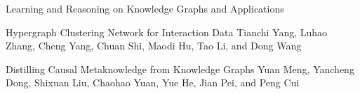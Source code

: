 \documentclass[11pt]{article}
\begin{document}
\begin{bulletin}
\begin{articlesection}{Learning and Reasoning on Knowledge Graphs and Applications}
\begin{article}
{Hypergraph Clustering Network for Interaction Data}
{Tianchi Yang, Luhao Zhang, Cheng Yang, Chuan Shi, Maodi Hu, Tao Li, and Dong Wang}

\end{article}


\begin{article}
{Distilling Causal Metaknowledge from Knowledge Graphs}
{Yuan Meng, Yancheng Dong, Shixuan Liu, Chaohao Yuan, Yue He, Jian Pei, and Peng Cui}

\end{article}



\end{articlesection}




%
%



\begin{callsection}


\end{callsection}
\end{bulletin}
\end{document}
